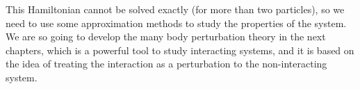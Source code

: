 This Hamiltonian cannot be solved exactly (for more than two particles), so we need to use some approximation methods to study the properties of the system. We are so going to develop the many body perturbation theory in the next chapters, which is a powerful tool to study interacting systems, and it is based on the idea of treating the interaction as a perturbation to the non-interacting system.